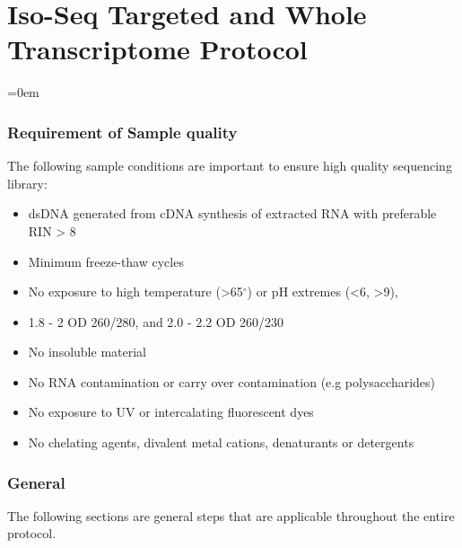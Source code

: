 \chapter{Iso-Seq Targeted and Whole Transcriptome Protocol}\label{app_longread_protocol}

\begingroup
\parindent=0em
\localtableofcontents 
\endgroup
\subsection{Requirement of Sample quality}
The following sample conditions are important to ensure high quality sequencing library: 
\begin{itemize}
	\item dsDNA generated from cDNA synthesis of extracted RNA with preferable RIN > 8
	\item Minimum freeze-thaw cycles 
	\item No exposure to high temperature (>65$^{\circ}$) or pH extremes (<6, >9), 
	\item 1.8 - 2 OD 260/280, and 2.0 - 2.2 OD 260/230 
	\item No insoluble material  
	\item No RNA contamination or carry over contamination (e.g polysaccharides)
	\item No exposure to UV or intercalating fluorescent dyes 
	\item No chelating agents, divalent metal cations, denaturants or detergents
	
\end{itemize}

\subsection{General}
The following sections are general steps that are applicable throughout the entire protocol. 

